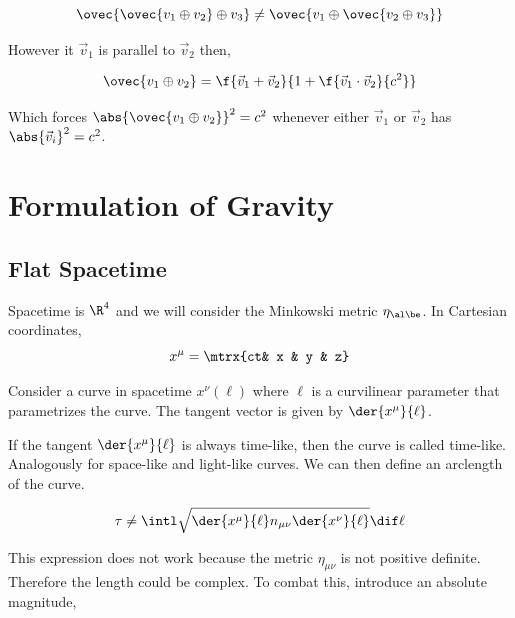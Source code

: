 \documentclass{article}
\begin{document}
\[ \ovec{\ovec{v_1 \oplus v_2} \oplus v_3} \neq \ovec{v_1 \oplus \ovec{v_2 \oplus v_3}} \]

However it $\vec{v}_1$ is parallel to $\vec{v}_2$ then,

\[ \ovec{v_1 \oplus v_2} = \f{\vec{v}_1 + \vec{v}_2}{1 + \f{\vec{v}_1 \cdot \vec{v}_2}{c^2}} \]

Which forces $\abs{\ovec{v_1 \oplus v_2}}^2 = c^2$ whenever either $\vec{v}_1$ or $\vec{v}_2$ has $\abs{\vec{v}_i}^2 = c^2$.

\section{Formulation of Gravity}

\subsection{Flat Spacetime}

Spacetime is $\R^4$ and we will consider the Minkowski metric $\eta_{\al\be}$. In Cartesian coordinates,
\[ x^\mu = \mtrx{ct& x & y & z} \]

Consider a curve in spacetime $x^\nu(\ell)$ where $\ell$ is a curvilinear parameter that parametrizes the curve. The tangent vector is given by $\der{x^\mu}{\ell}$.

\begin{center}
\end{center}

If the tangent $\der{x^\mu}{\ell}$ is always time-like, then the curve is called time-like. Analogously for space-like and light-like curves. We can then define an arclength of the curve.

\[ \tau \neq \intl \sqrt{\der{x^\mu}{\ell} n_{\mu\nu} \der{x^\nu}{\ell}} \dif \ell \]

This expression does not work because the metric $\eta_{\mu\nu}$ is not positive definite. Therefore the length could be complex. To combat this, introduce an absolute magnitude,
\end{document}
